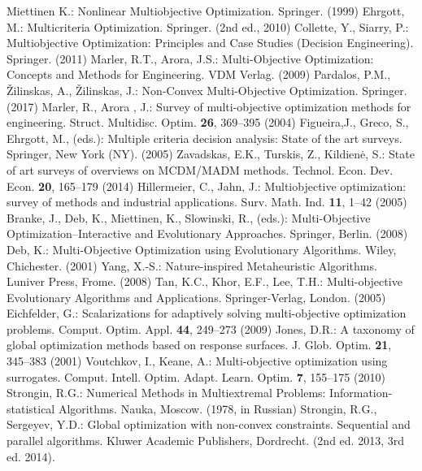 \documentclass[smallextended]{svjour3}       %
\begin{document}
\begin{thebibliography}{}
%
%

 Miettinen K.: Nonlinear Multiobjective Optimization. Springer. (1999)
 Ehrgott, M.: Multicriteria Optimization. Springer. (2nd ed., 2010)
 Collette, Y., Siarry, P.: Multiobjective Optimization: Principles and Case Studies (Decision Engineering). Springer. (2011)
 Marler, R.T., Arora, J.S.: Multi-Objective Optimization: Concepts and Methods for Engineering. VDM Verlag. (2009)
 Pardalos, P.M., {\v Z}ilinskas, A., {\v Z}ilinskas, J.: Non-Convex Multi-Objective Optimization. Springer. (2017)
 Marler, R., Arora , J.: Survey of multi-objective optimization methods for engineering. Struct. Multidisc. Optim. \textbf{26}, 369--395 (2004)
 Figueira,J., Greco, S., Ehrgott, M., (eds.): Multiple criteria decision analysis: State of the art surveys. Springer, New York (NY). (2005)
 Zavadskas, E.K., Turskis, Z., Kildien\.e, S.: State of art surveys of overviews on MCDM/MADM methods. Technol. Econ. Dev. Econ. \textbf{20}, 165--179 (2014)
 Hillermeier, C., Jahn, J.: Multiobjective optimization: survey of methods and industrial applications. Surv. Math. Ind. \textbf{11}, 1--42 (2005)
 Branke, J., Deb, K., Miettinen, K., Slowinski, R., (eds.): Multi-Objective Optimization--Interactive and Evolutionary Approaches. Springer, Berlin. (2008)
 Deb, K.: Multi-Objective Optimization using Evolutionary Algorithms. Wiley, Chichester. (2001)
 Yang, X.-S.: Nature-inspired Metaheuristic Algorithms. Luniver Press, Frome. (2008) 
 Tan, K.C., Khor, E.F., Lee, T.H.: Multi-objective Evolutionary Algorithms and Applications. Springer-Verlag, London. (2005)
 Eichfelder, G.: Scalarizations for adaptively solving multi-objective optimization problems. Comput. Optim. Appl. \textbf{44}, 249--273 (2009)
 Jones, D.R.: A taxonomy of global optimization methods based on response surfaces. J. Glob. Optim. \textbf{21}, 345--383 (2001)
 Voutchkov, I., Keane, A.: Multi-objective optimization using surrogates. Comput. Intell. Optim. Adapt. Learn. Optim. \textbf{7}, 155--175 (2010)
 Strongin, R.G.: Numerical Methods in Multiextremal Problems: Information-statistical Algorithms. Nauka, Moscow. (1978, in Russian) 
 Strongin, R.G., Sergeyev, Y.D.: Global optimization with non-convex constraints. Sequential and parallel algorithms. Kluwer Academic Publishers, Dordrecht. (2nd ed. 2013, 3rd ed. 2014).

\end{thebibliography}
\end{document}
